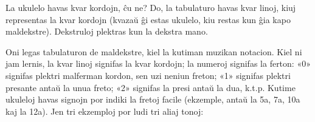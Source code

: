 La ukulelo havas kvar kordojn, ĉu ne? Do, la tabulaturo havas kvar linoj, kiuj representas la kvar kordojn (kvazaŭ ĝi estas ukulelo, kiu restas kun ĝia kapo maldekstre). Dekstruloj plektras kun la dekstra mano.

Oni legas tabulaturon de maldekstre, kiel la kutiman muzikan notacion. Kiel ni jam lernis, la kvar linoj signifas la kvar kordojn; la numeroj signifas la ferton: «0» signifas plektri malferman kordon, sen uzi neniun freton; «1» signifas plektri presante antaŭ la unua freto; «2» signifas la presi antaŭ la dua, k.t.p. Kutime ukuleloj havas signojn por indiki la fretoj facile (ekzemple, antaŭ la 5a, 7a, 10a kaj la 12a). Jen tri ekzemploj por ludi tri aliaj tonoj:


